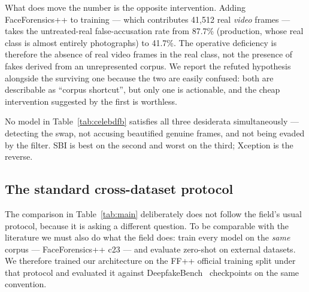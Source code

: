 \documentclass[conference]{IEEEtran}
\begin{document}
What does move the number is the opposite intervention. Adding FaceForensics++ to training
--- which contributes 41{,}512 real \emph{video} frames --- takes the untreated-real
false-accusation rate from 87.7\% (production, whose real class is almost entirely
photographs) to 41.7\%. The operative deficiency is therefore the absence of real video
frames in the real class, not the presence of fakes derived from an unrepresented corpus.
We report the refuted hypothesis alongside the surviving one because the two are easily
confused: both are describable as ``corpus shortcut'', but only one is actionable, and the
cheap intervention suggested by the first is worthless.

No model in Table~\ref{tab:celebdfb} satisfies all three desiderata simultaneously ---
detecting the swap, not accusing beautified genuine frames, and not being evaded by the
filter. SBI is best on the second and worst on the third; Xception is the reverse.

\subsection{The standard cross-dataset protocol}
\label{sec:crossdataset}
The comparison in Table~\ref{tab:main} deliberately does not follow the field's usual
protocol, because it is asking a different question. To be comparable with the literature we
must also do what the field does: train every model on the \emph{same} corpus --- FaceForensics++
c23 --- and evaluate zero-shot on external datasets. We therefore trained our architecture on
the FF++ official training split under that protocol and evaluated it against
DeepfakeBench~\cite{yan2023bench} checkpoints on the same convention.
\end{document}
